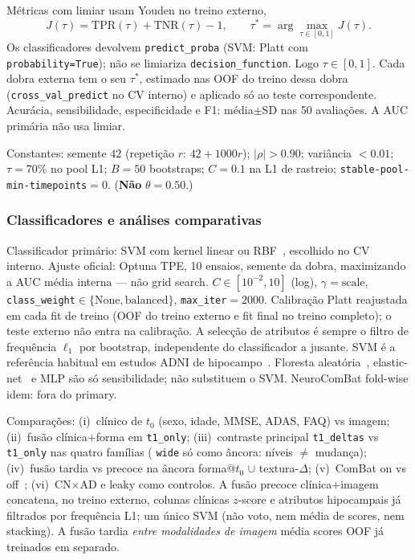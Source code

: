 \documentclass[review]{elsarticle}
\newcommand{\code}[1]{\texttt{#1}}
\begin{document}
	Métricas com limiar usam Youden no treino externo,
	\begin{equation}
		J(\tau) = \mathrm{TPR}(\tau) + \mathrm{TNR}(\tau) - 1,
		\qquad
		\tau^{*} = \arg\max_{\tau \in [0,1]} J(\tau).
		\label{eq:youden}
	\end{equation}
	Os classificadores devolvem \code{predict\_proba} (SVM: Platt com \code{probability=True}); não se limiariza \code{decision\_function}.
	Logo $\tau\in[0,1]$.
	Cada dobra externa tem o seu $\tau^{*}$, estimado nas OOF do treino dessa dobra (\code{cross\_val\_predict} no CV interno) e aplicado só ao teste correspondente.
	Acurácia, sensibilidade, especificidade e F1: média$\pm$SD nas 50 avaliações.
	A AUC primária não usa limiar.
	
	Constantes: semente $42$ (repetição $r$: $42+1000r$); $|\rho|>0.90$; variância $<0.01$; $\tau=70\%$ no pool L1; $B=50$ bootstraps; $C=0.1$ na L1 de rastreio; \code{stable-pool-min-timepoints}$=0$.
	(\textbf{Não} $\theta=0.50$.)
	
	\subsubsection{Classificadores e análises comparativas}
	
	Classificador primário: SVM com kernel linear ou RBF~\cite{cortes-1995}, escolhido no CV interno.
	Ajuste oficial: Optuna TPE, 10 ensaios, semente da dobra, maximizando a AUC média interna --- não grid search.
	$C\in[10^{-2},10]$ (log), $\gamma=\mathrm{scale}$, \code{class\_weight}$\in\{\mathrm{None},\mathrm{balanced}\}$, \code{max\_iter}$=2000$.
	Calibração Platt reajustada em cada fit de treino (OOF do treino externo e fit final no treino completo); o teste externo não entra na calibração.
	A selecção de atributos é sempre o filtro de frequência $\ell_1$ por bootstrap, independente do classificador a jusante.
	SVM é a referência habitual em estudos ADNI de hipocampo~\cite{cuingnet-2011}.
	Floresta aleatória~\cite{breiman-2001}, elastic-net~\cite{zou-2005} e MLP são só sensibilidade; não substituem o SVM.
	NeuroComBat fold-wise idem: fora do primary.
	
	Comparações: (i)~clínico de $t_0$ (sexo, idade, MMSE, ADAS, FAQ) vs imagem;
	(ii)~fusão clínica$+$forma em \code{t1\_only};
	(iii)~contraste principal \code{t1\_deltas} vs \code{t1\_only} nas quatro famílias ( \code{wide} só como âncora: níveis $\neq$ mudança);
	(iv)~fusão tardia vs precoce na âncora forma@$t_0$ $\cup$ textura-$\Delta$;
	(v)~ComBat on vs off~\cite{fortin-2018};
	(vi)~CN$\times$AD e leaky como controlos.
	A fusão precoce clínica$+$imagem concatena, no treino externo, colunas clínicas $z$-score e atributos hipocampais já filtrados por frequência L1; um único SVM (não voto, nem média de scores, nem stacking).
	A fusão tardia \emph{entre modalidades de imagem} média scores OOF já treinados em separado.
	
\end{document}
